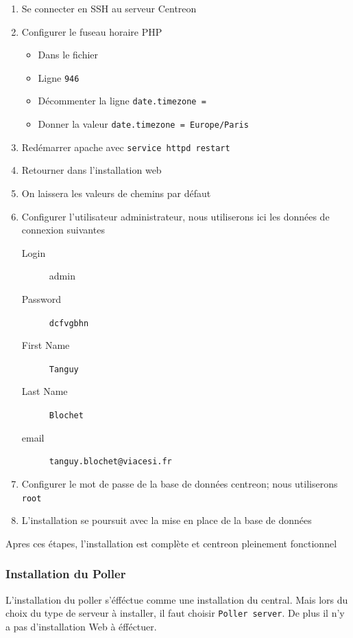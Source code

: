 	\begin{enumerate}
		\item Se connecter en SSH au serveur Centreon
		\item Configurer le fuseau horaire PHP
		\begin{itemize}
			\item Dans le fichier 
			\item Ligne \texttt{946}
			\item Décommenter la ligne \texttt{date.timezone = }
			\item Donner la valeur \texttt{date.timezone = Europe/Paris}
		\end{itemize}
		\item Redémarrer apache avec \texttt{service httpd restart}
		\item Retourner dans l'installation web
		\item On laissera les valeurs de chemins par défaut
		\item Configurer l'utilisateur administrateur, nous utiliserons ici les données de connexion suivantes
		\begin{description}
			\item[Login] admin
			\item[Password] \texttt{dcfvgbhn}
			\item[First Name] \texttt{Tanguy}
			\item[Last Name] \texttt{Blochet}
			\item[email] \texttt{tanguy.blochet@viacesi.fr}
		\end{description}
		\item Configurer le mot de passe de la base de données centreon; nous utiliserons \texttt{root}
		\item L'installation se poursuit avec la mise en place de la base de données
	\end{enumerate}

	Apres ces étapes, l'installation est complète et centreon pleinement fonctionnel

	\subsubsection{Installation du Poller}

	L'installation du poller s'éfféctue comme une installation du central.
	Mais lors du choix du type de serveur à installer, il faut choisir \texttt{Poller server}.
	De plus il n'y a pas d'installation Web à éfféctuer.

